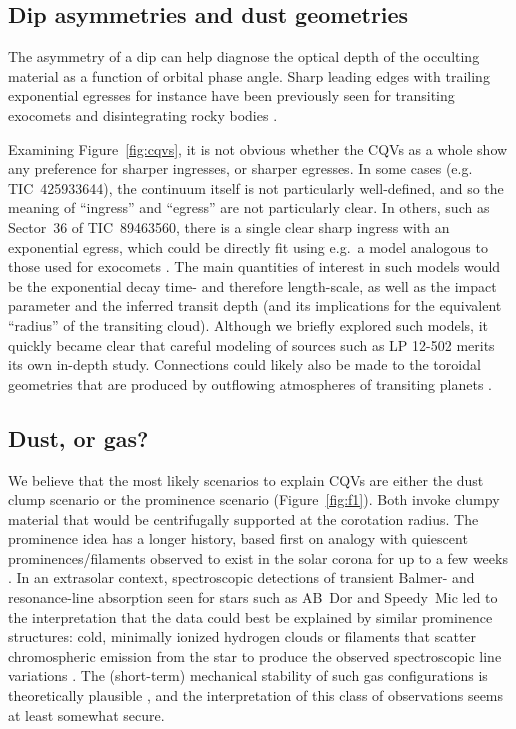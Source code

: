 \documentclass[11pt,twocolumn,tighten]{aastex63}
\begin{document}
\subsection{Dip asymmetries and dust geometries}
The asymmetry of a dip can help diagnose the optical depth of the
occulting material as a function of orbital phase angle.  Sharp
leading edges with trailing exponential egresses for instance have
been previously seen for transiting exocomets and disintegrating rocky
bodies
\citep[e.g.][]{2012ApJ...752....1R,2012A&A...545L...5B,2015Natur.526..546V,2019A&A...625L..13Z}.

Examining Figure~\ref{fig:cqvs}, it is not obvious whether the CQVs as
a whole show any preference for sharper ingresses, or sharper
egresses.  In some cases (e.g. TIC~425933644), the continuum itself is
not particularly well-defined, and so the meaning of ``ingress'' and
``egress'' are not particularly clear.  In others, such as Sector~36
of TIC~89463560, there is a single clear sharp ingress with an
exponential egress, which could be directly fit using e.g.~a model
analogous to those used for exocomets
\citep[e.g.][]{2019A&A...625L..13Z}.  The main quantities of interest
in such models would be the exponential decay time- and therefore
length-scale, as well as the impact parameter and the inferred transit
depth (and its implications for the equivalent ``radius'' of the
transiting cloud).  Although we briefly explored such models, it
quickly became clear that careful modeling of sources such as LP
12-502 merits its own in-depth study.  Connections could likely also
be made to the toroidal geometries that are produced by outflowing
atmospheres of transiting planets
\citep[e.g.][]{2019ApJ...873...89M,2022ApJ...926..226M}.



\subsection{Dust, or gas?}
We believe that the most likely scenarios to explain CQVs
are either the dust clump scenario or the prominence scenario
(Figure~\ref{fig:f1}).  Both invoke clumpy material that would be
centrifugally supported at the corotation radius.  The prominence idea
has a longer history, based first on analogy with quiescent
prominences/filaments observed to exist in the solar corona for up to
a few weeks \citep[see e.g.][]{2015ASSL..415.....V}.  In an extrasolar
context, spectroscopic detections of transient Balmer- and
resonance-line absorption seen for stars such as AB~Dor and Speedy~Mic
\citep[e.g.][]{1989MNRAS.238..657C,1993MNRAS.262..369J,2006MNRAS.365..530D,2016MNRAS.463..965L}
led to the interpretation that the data could best be explained by
similar prominence structures: cold, minimally ionized hydrogen clouds
or filaments that scatter chromospheric emission from the star to
produce the observed spectroscopic line variations
\citep[see][]{1989MNRAS.238..657C}.  The (short-term) mechanical
stability of such gas configurations is theoretically plausible
\citep{2000MNRAS.316..647F,2022MNRAS.514.5465W}, and the
interpretation of this class of observations seems at least somewhat
secure.
\end{document}
